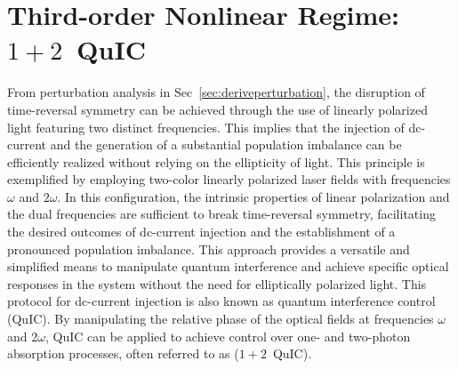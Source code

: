 \section{Third-order Nonlinear Regime: $1+2$~QuIC \label{sec:perturbative}}

From perturbation analysis in Sec~\ref{sec:deriveperturbation}, the disruption of time-reversal symmetry can be achieved through the use of linearly polarized light featuring two distinct frequencies. This implies that the injection of dc-current and the generation of a substantial population imbalance can be efficiently realized without relying on the ellipticity of light. This principle is exemplified by employing two-color linearly polarized laser fields with frequencies $\omega$ and $2\omega$. In this configuration, the intrinsic properties of linear polarization and the dual frequencies are sufficient to break time-reversal symmetry, facilitating the desired outcomes of dc-current injection and the establishment of a pronounced population imbalance. This approach provides a versatile and simplified means to manipulate quantum interference and achieve specific optical responses in the system without the need for elliptically polarized light. This protocol for dc-current injection is also known as quantum interference control (\gls{QuIC}). By manipulating the relative phase of the optical fields at frequencies $\omega$ and $2\omega$, QuIC can be applied to achieve control over one- and two-photon absorption processes, often referred to as ($1+2$~\gls{QuIC}).\\

